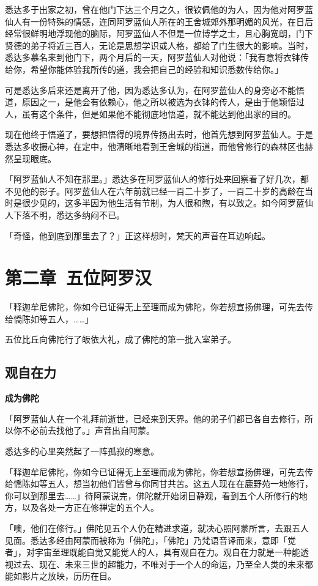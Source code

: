 \documentclass[twoside,openany]{book}
\newcommand{\mt}[1]{\textbullet \textbf{#1}}
\begin{document}
悉达多于出家之初，曾在他门下达三个月之久，很钦佩他的为人，因为他对阿罗蓝仙人有一份特殊的情感，连同阿罗蓝仙人所在的王舍城郊外那明媚的风光，在日后经常很鲜明地浮现他的脑际，阿罗蓝仙人不但是一位博学之士，且心胸宽朗，门下贤德的弟子将近三百人，无论是思想学识或人格，都给了门生很大的影响。当时，悉达多慕名来到他门下，两个月后的一天，阿罗蓝仙人对他说：「我有意将衣钵传给你，希望你能体验我所传的道，我会把自己的经验和知识悉数传给你。」

可是悉达多后来还是离开了他，因为悉达多认为，在阿罗蓝仙人的身旁必不能悟道，原因之一，是他会有依赖心，他之所以被选为衣钵的传人，是由于他颖悟过人，虽有这个条件，但是如果他不能彻底地悟道，就不能达到他出家的目的。

现在他终于悟道了，要想把悟得的境界传扬出去时，他首先想到阿罗蓝仙人。于是悉达多收摄心神，在定中，他清晰地看到王舍城的街道，而他曾修行的森林区也赫然呈现眼底。

「阿罗蓝仙人不知在那里。」悉达多在阿罗蓝仙人的修行处来回察看了好几次，都不见他的影子。阿罗蓝仙人在六年前就已经一百二十岁了，一百二十岁的高龄在当时是很少见的，这多半因为他生活有节制，为人很和煦，有以致之。如今阿罗蓝仙人下落不明，悉达多纳闷不已。

「奇怪，他到底到那里去了？」正这样想时，梵天的声音在耳边响起。

\chapter{第二章\ 五位阿罗汉}\label{ch2}
「释迦牟尼佛陀，你如今已证得无上至理而成为佛陀，你若想宣扬佛理，可先去传给憍陈如等五人，……」

五位比丘向佛陀行了皈依大礼，成了佛陀的第一批入室弟子。

\newpage
\section{观自在力}\label{sec2.1}
\mt{成为佛陀}

「阿罗蓝仙人在一个礼拜前逝世，已经来到天界。他的弟子们都已各自去修行，所以你不必前去找他了。」声音出自阿蒙。

悉达多的心里突然起了一阵孤寂的寒意。

「释迦牟尼佛陀，你如今已证得无上至理而成为佛陀，你若想宣扬佛理，可先去传给憍陈如等五人，想当初他们皆曾与你同甘共苦。这五人现在在鹿野苑一地修行，你可以到那里去……」待阿蒙说完，佛陀就开始闭目静观，看到五个人所修行的地方，以及各处一方正在修禅定的五个人。

「噢，他们在修行。」佛陀见五个人仍在精进求道，就决心照阿蒙所言，去跟五人见面。悉达多经由阿蒙而被称为「佛陀」，「佛陀」乃梵语音译而来，意即「觉者」，对宇宙至理既能自觉又能觉人的人，具有观自在力。观自在力就是一种能透视过去、现在、未来三世的超能力，不唯对于一个人的命运，乃至全人类的未来都能如影片之放映，历历在目。
\end{document}

